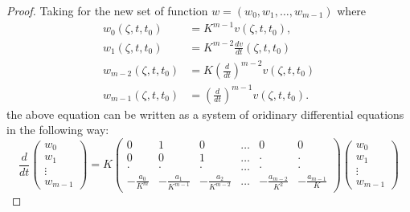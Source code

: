 \begin{proof}
Taking for the new set of function $w=(w_0, w_1, \ldots,  w_{m-1})$
where  
\begin{align*}
w_0 (\zeta, t, t_0) &= K^{m-1} v (\zeta,  t, t_0),\\ 
w_1 (\zeta,  t,  t_0) &= K^{m-2} \frac{dv}{dt} (\zeta ,  t,  t_0)\\ 
w_{m-2} (\zeta, t, t_0) &= K\left(\frac{d}{dt}\right)^{m-2} v (\zeta, t , t_0)\\
w_{m-1} (\zeta, t, t_0) &= \left(\frac{d}{dt}\right)^{m-1} v (\zeta, t, t_0).
\end{align*}
the above equation can be written as a system of oridinary
differential equations in the following way: 
\begin{equation}
\frac{d}{dt} \begin{pmatrix} w_0 \\ w_1 \\ \vdots
  \\ w_{m-1} \end{pmatrix} = K \begin{pmatrix} 0 & 1 & 0 & \ldots & 0
  & 0\\ 0 & 0 & 1 & \ldots & \cdot & \cdot \\ \cdot & \cdot & \cdot &
  \ldots & \cdot & 
  \cdot\\ -\frac{a_0}{K^m} &- \frac{a_1}{K^{m-1}} & -\frac{a_2}{K^{m-2}} &
  \ldots & -\frac{a_{m-2}}{K^2} &
  -\frac{a_{m-1}}{K} \end{pmatrix} \begin{pmatrix}  w_0 \\ w_1
  \\ \vdots \\w_{m-1} \end{pmatrix} \tag{3.6}\label{chap2-eq3.6}     
\end{equation}


\end{proof}
